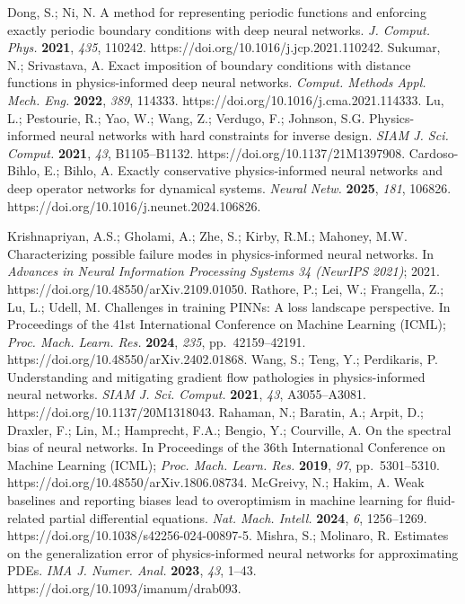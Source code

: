  Dong, S.; Ni, N. A method for representing periodic functions and enforcing exactly periodic boundary conditions with deep neural networks. \textit{J. Comput. Phys.} \textbf{2021}, \textit{435}, 110242. https://doi.org/10.1016/j.jcp.2021.110242.
 Sukumar, N.; Srivastava, A. Exact imposition of boundary conditions with distance functions in physics-informed deep neural networks. \textit{Comput. Methods Appl. Mech. Eng.} \textbf{2022}, \textit{389}, 114333. https://doi.org/10.1016/j.cma.2021.114333.
 Lu, L.; Pestourie, R.; Yao, W.; Wang, Z.; Verdugo, F.; Johnson, S.G. Physics-informed neural networks with hard constraints for inverse design. \textit{SIAM J. Sci. Comput.} \textbf{2021}, \textit{43}, B1105--B1132. https://doi.org/10.1137/21M1397908.
 Cardoso-Bihlo, E.; Bihlo, A. Exactly conservative physics-informed neural networks and deep operator networks for dynamical systems. \textit{Neural Netw.} \textbf{2025}, \textit{181}, 106826. https://doi.org/10.1016/j.neunet.2024.106826.

 Krishnapriyan, A.S.; Gholami, A.; Zhe, S.; Kirby, R.M.; Mahoney, M.W. Characterizing possible failure modes in physics-informed neural networks. In \textit{Advances in Neural Information Processing Systems 34 (NeurIPS 2021)}; 2021. https://doi.org/10.48550/arXiv.2109.01050.
 Rathore, P.; Lei, W.; Frangella, Z.; Lu, L.; Udell, M. Challenges in training PINNs: A loss landscape perspective. In Proceedings of the 41st International Conference on Machine Learning (ICML); \textit{Proc. Mach. Learn. Res.} \textbf{2024}, \textit{235}, pp.\ 42159--42191. https://doi.org/10.48550/arXiv.2402.01868.
 Wang, S.; Teng, Y.; Perdikaris, P. Understanding and mitigating gradient flow pathologies in physics-informed neural networks. \textit{SIAM J. Sci. Comput.} \textbf{2021}, \textit{43}, A3055--A3081. https://doi.org/10.1137/20M1318043.
 Rahaman, N.; Baratin, A.; Arpit, D.; Draxler, F.; Lin, M.; Hamprecht, F.A.; Bengio, Y.; Courville, A. On the spectral bias of neural networks. In Proceedings of the 36th International Conference on Machine Learning (ICML); \textit{Proc. Mach. Learn. Res.} \textbf{2019}, \textit{97}, pp.\ 5301--5310. https://doi.org/10.48550/arXiv.1806.08734.
 McGreivy, N.; Hakim, A. Weak baselines and reporting biases lead to overoptimism in machine learning for fluid-related partial differential equations. \textit{Nat. Mach. Intell.} \textbf{2024}, \textit{6}, 1256--1269. https://doi.org/10.1038/s42256-024-00897-5.
 Mishra, S.; Molinaro, R. Estimates on the generalization error of physics-informed neural networks for approximating PDEs. \textit{IMA J. Numer. Anal.} \textbf{2023}, \textit{43}, 1--43. https://doi.org/10.1093/imanum/drab093.

